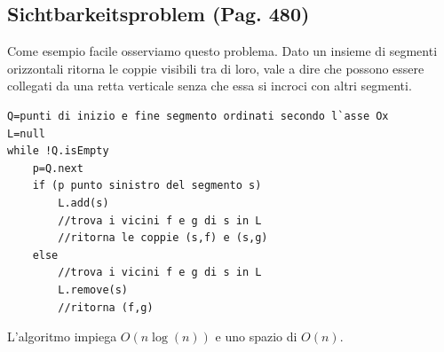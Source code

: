 \documentclass[a4paper]{book}
\newcommand{\lstIndent}{4}
\begin{document}
\subsection{Sichtbarkeitsproblem (Pag. 480)}
Come esempio facile osserviamo questo problema. Dato un insieme di segmenti orizzontali ritorna le coppie visibili tra di loro, vale a dire che possono essere collegati da una retta verticale senza che essa si incroci con altri segmenti.
\begin{lstlisting}[tabsize=\lstIndent]
Q=punti di inizio e fine segmento ordinati secondo l`asse Ox
L=null
while !Q.isEmpty
	p=Q.next
	if (p punto sinistro del segmento s)
		L.add(s)
		//trova i vicini f e g di s in L
		//ritorna le coppie (s,f) e (s,g)
	else
		//trova i vicini f e g di s in L	
		L.remove(s)
		//ritorna (f,g)
\end{lstlisting}
L'algoritmo impiega $O(n \log (n))$ e uno spazio di $O(n)$.
\end{document}
